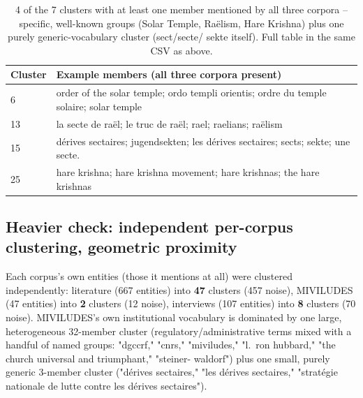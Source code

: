 \documentclass[11pt,a4paper]{article}
\begin{document}
\begin{table}[h!]
\centering
\small
\begin{tabular}{p{0.7cm}p{9.5cm}}
\toprule
Cluster & Example members (all three corpora present) \\
\midrule
6 & order of the solar temple; ordo templi orientis; ordre du temple solaire; solar temple \\
13 & la secte de ra\"el; le truc de ra\"el; rael; raelians; ra\"elism \\
15 & d\'erives sectaires; jugendsekten; les d\'erives sectaires; sects; sekte; une secte. \\
25 & hare krishna; hare krishna movement; hare krishnas; the hare krishnas \\
\bottomrule
\end{tabular}
\caption{4 of the 7 clusters with at least one member mentioned by all
three corpora -- specific, well-known groups (Solar Temple, Ra\"elism,
Hare Krishna) plus one purely generic-vocabulary cluster (sect/secte/
sekte itself). Full table in the same CSV as above.}
\end{table}

\subsection{Heavier check: independent per-corpus clustering, geometric proximity}

Each corpus's own entities (those it mentions at all) were clustered
independently: literature (667 entities) into \textbf{47} clusters
(457 noise), MIVILUDES (47 entities) into \textbf{2} clusters (12
noise), interviews (107 entities) into \textbf{8} clusters (70 noise).
MIVILUDES's own institutional vocabulary is dominated by one large,
heterogeneous 32-member cluster (regulatory/administrative terms mixed
with a handful of named groups: "dgccrf," "cnrs," "miviludes,"
"l.\ ron hubbard," "the church universal and triumphant," "steiner-
waldorf") plus one small, purely generic 3-member cluster ("d\'erives
sectaires," "les d\'erives sectaires," "strat\'egie nationale de lutte
contre les d\'erives sectaires").
\end{document}
